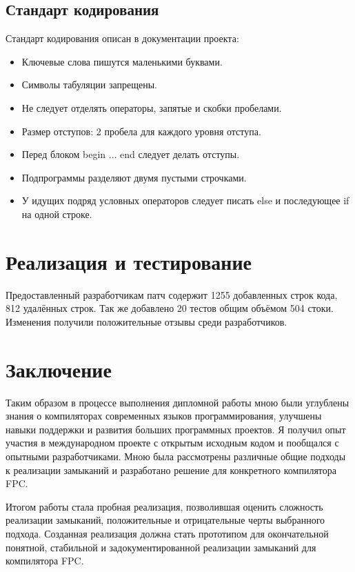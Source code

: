 \documentclass{imcs}
\begin{document}
\subsection{Стандарт кодирования}

Стандарт кодирования описан в документации проекта\cite{codingstyle}:
\begin{itemize}
  \item Ключевые слова пишутся маленькими буквами.
  \item Символы табуляции запрещены.
  \item Не следует отделять операторы, запятые и скобки пробелами.
  \item Размер отступов: 2 пробела для каждого уровня отступа.
  \item Перед блоком begin ... end следует делать отступы.
  \item Подпрограммы разделяют двумя пустыми строчками.
  \item У идущих подряд условных операторов следует писать else и последующее if 
на одной строке.
\end{itemize}

\section{Реализация и тестирование}

Предоставленный разработчикам патч содержит 1255 добавленных строк кода, 812 удалённых строк.
Так же добавлено 20 тестов общим объёмом 504 стоки. Изменения получили положительные отзывы
среди разработчиков\cite{mantis}.

\pagebreak

\section*{Заключение}

Таким образом в процессе выполнения дипломной работы мною были углублены
знания о компиляторах современных языков программирования, улучшены навыки
поддержки и развития больших программных проектов. Я получил опыт участия в 
международном проекте с открытым исходным кодом и пообщался с опытными разработчиками.
Мною была рассмотрены различные общие подходы к реализации замыканий и разработано
решение для конкретного компилятора FPC.

Итогом работы стала пробная реализация, позволившая оценить сложность реализации 
замыканий, положительные и отрицательные черты выбранного подхода.
Созданная реализация должна
стать прототипом для окончательной понятной, стабильной и задокументированной
реализации замыканий для компилятора FPC.
\end{document}
